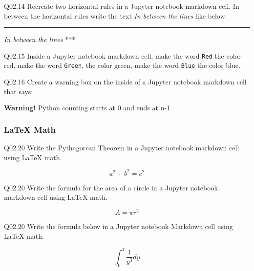\documentclass{book}
\newenvironment{problems}{}{}  %
\newcommand{\passthrough}[1]{#1}
\begin{document}
\begin{problems}
Q02.14 Recreate two horizontal rules in a Jupyter notebook markdown
cell. In between the horizontal rules write the text \emph{In between
the lines} like below:

\begin{center}\rule{0.5\linewidth}{\linethickness}\end{center}

\emph{In between the lines} ***

Q02.15 Inside a Jupyter notebook markdown cell, make the word
\passthrough{\lstinline!Red!} the color red, make the word
\passthrough{\lstinline!Green!}, the color green, make the word
\passthrough{\lstinline!Blue!} the color blue.

Q02.16 Create a warning box on the inside of a Jupyter notebook markdown
cell that says:

\textbf{Warning!} Python counting starts at 0 and ends at n-1
        \end{problems}

    




    
        \hypertarget{latex-math}{%
\subsubsection{LaTeX Math}\label{latex-math}}

Q02.20 Write the Pythagorean Theorem in a Jupyter notebook markdown cell
using LaTeX math.

\[ a^2 + b^2 = c^2 \]

Q02.20 Write the formula for the area of a circle in a Jupyter notebook
markdown cell using LaTeX math.

\[ A = \pi r^2 \]

Q02.20 Write the formula below in a Jupyter notebook Markdown cell using
LaTeX math.

\[ \int_{0}^{1} \frac{1}{y^3} dy \]
    
\end{document}
